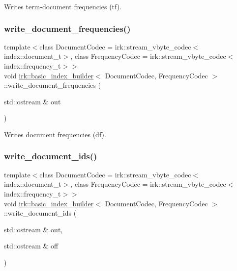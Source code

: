 Writes term-\/document frequencies (tf). 

\mbox{\label{classirk_1_1basic__index__builder_a06053105f446531a65192e987dbdb839}} 
\subsubsection{\texorpdfstring{write\+\_\+document\+\_\+frequencies()}{write\_document\_frequencies()}}
{\footnotesize\ttfamily template$<$class Document\+Codec  = irk\+::stream\+\_\+vbyte\+\_\+codec$<$index\+::document\+\_\+t$>$, class Frequency\+Codec  = irk\+::stream\+\_\+vbyte\+\_\+codec$<$index\+::frequency\+\_\+t$>$$>$ \\
void \mbox{\hyperlink{classirk_1_1basic__index__builder}{irk\+::basic\+\_\+index\+\_\+builder}}$<$ Document\+Codec, Frequency\+Codec $>$\+::write\+\_\+document\+\_\+frequencies (\begin{DoxyParamCaption}\item[{std\+::ostream \&}]{out }\end{DoxyParamCaption})\hspace{0.3cm}{\ttfamily [inline]}}



Writes document frequencies (df). 

\mbox{\label{classirk_1_1basic__index__builder_a4c4449ae288aaf72e3d42cf5d05f1e33}} 
\subsubsection{\texorpdfstring{write\+\_\+document\+\_\+ids()}{write\_document\_ids()}}
{\footnotesize\ttfamily template$<$class Document\+Codec  = irk\+::stream\+\_\+vbyte\+\_\+codec$<$index\+::document\+\_\+t$>$, class Frequency\+Codec  = irk\+::stream\+\_\+vbyte\+\_\+codec$<$index\+::frequency\+\_\+t$>$$>$ \\
void \mbox{\hyperlink{classirk_1_1basic__index__builder}{irk\+::basic\+\_\+index\+\_\+builder}}$<$ Document\+Codec, Frequency\+Codec $>$\+::write\+\_\+document\+\_\+ids (\begin{DoxyParamCaption}\item[{std\+::ostream \&}]{out,  }\item[{std\+::ostream \&}]{off }\end{DoxyParamCaption})\hspace{0.3cm}{\ttfamily [inline]}}




